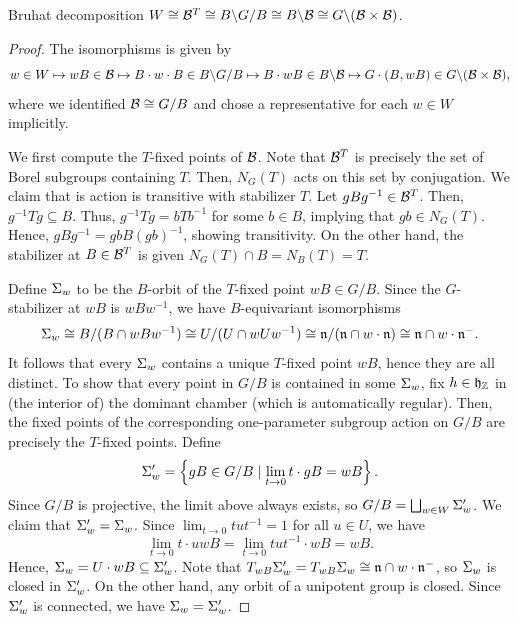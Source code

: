\begin{lemma}{Bruhat decomposition}
    $W \cong \mathcal{B}^T \cong B\backslash G/B \cong B \backslash \mathcal{B} \cong G \backslash (\mathcal{B} \times \mathcal{B})$.
    \begin{proof}
        The isomorphisms is given by
        \begin{equation*}
            w \in W \mapsto wB \in \mathcal{B} \mapsto B \cdot w \cdot B \in B\backslash G/B \mapsto B \cdot wB \in B \backslash \mathcal{B} \mapsto G \cdot (B, wB) \in G \backslash (\mathcal{B} \times \mathcal{B}),
        \end{equation*}
        where we identified $\mathcal{B} \cong G/B$ and chose a representative for each $w \in W$ implicitly.

        We first compute the $T$-fixed points of $\mathcal{B}$. Note that $\mathcal{B}^T$ is precisely the set of Borel subgroups containing $T$. Then, $N_G(T)$ acts on this set by conjugation. We claim that is action is transitive with stabilizer $T$. Let $gBg^{-1} \in \mathcal{B}^T$. Then, $g^{-1}Tg \subseteq B$. Thus, $g^{-1}Tg = bTb^{-1}$ for some $b \in B$, implying that $gb \in N_G(T)$. Hence, $gBg^{-1} = gbB(gb)^{-1}$, showing transitivity. On the other hand, the stabilizer at $B \in \mathcal{B}^T$ is given $N_G(T) \cap B = N_B(T) = T$.
        
        Define $\Sigma_w$ to be the $B$-orbit of the $T$-fixed point $wB \in G/B$. Since the $G$-stabilizer at $wB$ is $wBw^{-1}$, we have $B$-equivariant isomorphisms
        \begin{equation*}
            \Sigma_w \cong B / (B \cap wBw^{-1}) \cong U / (U \cap wUw^{-1}) \cong \mathfrak{n} / (\mathfrak{n} \cap w \cdot \mathfrak{n}) \cong \mathfrak{n} \cap w \cdot \mathfrak{n}^-.
        \end{equation*}
        It follows that every $\Sigma_w$ contains a unique $T$-fixed point $wB$, hence they are all distinct. To show that every point in $G/B$ is contained in some $\Sigma_w$, fix $h \in \mathfrak{h}_\mathbb{Z}$ in (the interior of) the dominant chamber (which is automatically regular). Then, the fixed points of the corresponding one-parameter subgroup action on $G/B$ are precisely the $T$-fixed points. Define
        \begin{equation*}
            \Sigma_w' = \left\{ gB \in G/B \mid \lim_{t \to 0} t \cdot gB = wB \right\}.
        \end{equation*}
        Since $G/B$ is projective, the limit above always exists, so $G/B = \bigsqcup_{w \in W} \Sigma_w'$. We claim that $\Sigma_w' = \Sigma_w$. Since $\lim_{t \to 0} tut^{-1} = 1$ for all $u \in U$, we have
        \begin{equation*}
            \lim_{t \to 0} t \cdot uwB = \lim_{t \to 0} tut^{-1} \cdot wB = wB.
        \end{equation*}
        Hence, $\Sigma_w = U \cdot wB \subseteq \Sigma_w'$. Note that $T_{wB}\Sigma_w' = T_{wB} \Sigma_w \cong \mathfrak{n} \cap w \cdot \mathfrak{n}^-$, so $\Sigma_w$ is closed in $\Sigma_w'$. On the other hand, any orbit of a unipotent group is closed. Since $\Sigma_w'$ is connected, we have $\Sigma_w = \Sigma_w'$.
    \end{proof}
\end{lemma}

